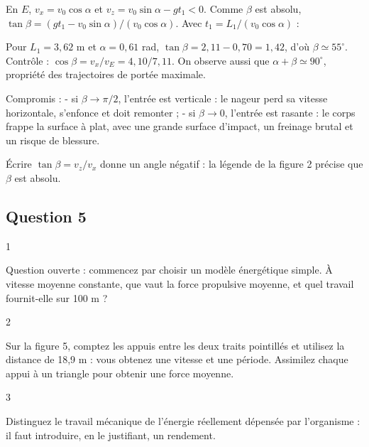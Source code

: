 \documentclass[11pt,a4paper]{article}
\newcommand{\equationajustee}[1]{%
  \sbox{\boiteequation}{$\displaystyle #1$}%
  \ifdim\wd\boiteequation>\linewidth
    \[\resizebox{\linewidth}{!}{\usebox{\boiteequation}}\]%
  \else
    \[#1\]%
  \fi}
\begin{document}
En \(E\), \(v_x = v_0\cos\alpha\) et \(v_z = v_0\sin\alpha - g t_1 < 0\). Comme \(\beta\) est absolu, \(\tan\beta = (g t_1 - v_0\sin\alpha)/(v_0\cos\alpha)\). Avec \(t_1 = L_1/(v_0\cos\alpha)\) :

\equationajustee{\boxed{\beta = \arctan\left(\frac{g L_1}{v_0^2\cos^2\alpha} - \tan\alpha\right)}}

Pour \(L_1 = 3{,}62\) m et \(\alpha = 0{,}61\) rad, \(\tan\beta = 2{,}11 - 0{,}70 = 1{,}42\), d'où \(\boxed{\beta \simeq 55^\circ}\). Contrôle : \(\cos\beta = v_x/v_E = 4{,}10/7{,}11\). On observe aussi que \(\alpha + \beta \simeq 90^\circ\), propriété des trajectoires de portée maximale.

Compromis :
- si \(\beta \to \pi/2\), l'entrée est verticale : le nageur perd sa vitesse horizontale, s'enfonce et doit remonter ;
- si \(\beta \to 0\), l'entrée est rasante : le corps frappe la surface à plat, avec une grande surface d'impact, un freinage brutal et un risque de blessure.

\begin{piege}

Écrire \(\tan\beta = v_z/v_x\) donne un angle négatif : la légende de la figure 2 précise que \(\beta\) est absolu.

\end{piege}

\hypertarget{question-5}{%
\subsection{Question 5}\label{question-5}}

\begin{indication}{1}

Question ouverte : commencez par choisir un modèle énergétique simple. À vitesse moyenne constante, que vaut la force propulsive moyenne, et quel travail fournit-elle sur 100 m ?

\end{indication}

\begin{indication}{2}

Sur la figure 5, comptez les appuis entre les deux traits pointillés et utilisez la distance de 18,9 m : vous obtenez une vitesse et une période. Assimilez chaque appui à un triangle pour obtenir une force moyenne.

\end{indication}

\begin{indication}{3}

Distinguez le travail mécanique de l'énergie réellement dépensée par l'organisme : il faut introduire, en le justifiant, un rendement.

\end{indication}
\end{document}
